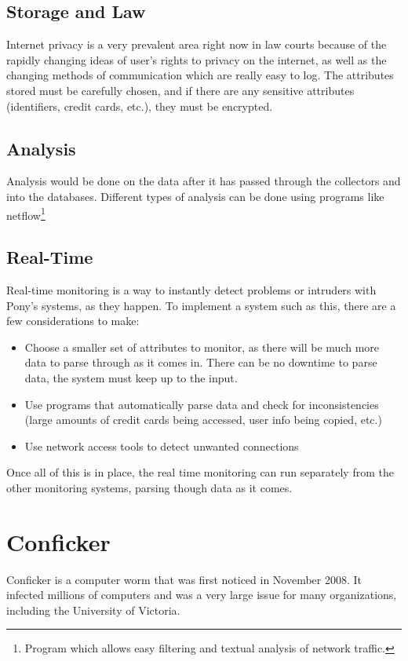 \documentclass{article}
\numberwithin{equation}{section} %
\numberwithin{figure}{section} %
\numberwithin{table}{section} %
\begin{document}
\subsection{Storage and Law}
\label{sec:law}
Internet privacy is a very prevalent area right now in law courts because of the rapidly changing ideas of user's rights to privacy on the internet, as well as the changing methods of communication which are really easy to log.  The attributes stored must be carefully chosen, and if there are any sensitive attributes (identifiers, credit cards, etc.), they must be encrypted.  

\subsection{Analysis}
Analysis would be done on the data after it has passed through the collectors and into the databases. Different types of analysis can be done using programs like netflow\footnote{Program which allows easy filtering and textual analysis of network traffic.}

\subsection{Real-Time}
Real-time monitoring is a way to instantly detect problems or intruders with Pony's systems, as they happen. To implement a system such as this, there are a few considerations to make: 
\begin{itemize}
	\item Choose a smaller set of attributes to monitor, as there will be much more data to parse through as it comes in.  There can be no downtime to parse data, the system must keep up to the input.
	\item Use programs that automatically parse data and check for inconsistencies (large amounts of credit cards being accessed, user info being copied, etc.)
	\item Use network access tools to detect unwanted connections
\end{itemize}
Once all of this is in place, the real time monitoring can run separately from the other monitoring systems, parsing though data as it comes.

\section{Conficker}
Conficker is a computer worm that was first noticed in November 2008.  It infected millions of computers and was a very large issue for many organizations, including the University of Victoria.  
\end{document}
